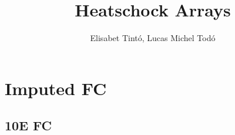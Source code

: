\documentclass{article}\usepackage[]{graphicx}\usepackage[]{color}
\newenvironment{knitrout}{}{} %
\begin{document}
  
\title{Heatschock Arrays}
\author{Elisabet Tintó, Lucas Michel Todó}
\maketitle
\tableofcontents
\clearpage


\section{Imputed FC}


\subsection{10E FC}
\begin{knitrout}
\color{fgcolor}\begin{table}[H]
\centering{}


\end{table}
\end{knitrout}
\end{document}
